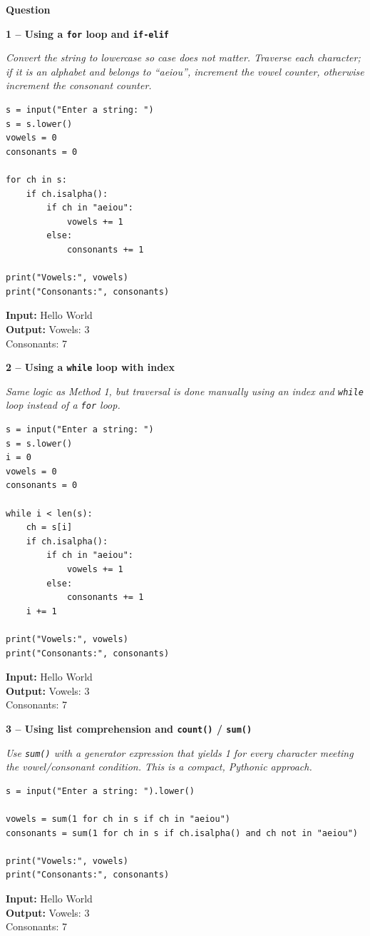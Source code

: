\documentclass[12pt]{article}
\newenvironment{qbox}[1]{\par\bigskip\noindent\textbf{#1}\par}{\par\medskip}
\newcommand{\1}{Question}
\newcommand{\method}[1]{\par\medskip\noindent\textbf{#1}\par}
\newcommand{\logicbox}[1]{\par\smallskip\noindent\textit{#1}\par}
\newcommand{\inout}[2]{\par\smallskip\noindent\textbf{Input:} #1\\\textbf{Output:} #2\par}
\begin{document}
\begin{qbox}{\1}

\method{1 -- Using a \texttt{for} loop and \texttt{if-elif}}
\logicbox{Convert the string to lowercase so case does not matter. Traverse each character; if it is an alphabet and belongs to ``aeiou'', increment the vowel counter, otherwise increment the consonant counter.}
\begin{lstlisting}
s = input("Enter a string: ")
s = s.lower()
vowels = 0
consonants = 0

for ch in s:
    if ch.isalpha():
        if ch in "aeiou":
            vowels += 1
        else:
            consonants += 1

print("Vowels:", vowels)
print("Consonants:", consonants)
\end{lstlisting}
\inout{Hello World}{Vowels: 3\\Consonants: 7}

\method{2 -- Using a \texttt{while} loop with index}
\logicbox{Same logic as Method 1, but traversal is done manually using an index and \texttt{while} loop instead of a \texttt{for} loop.}
\begin{lstlisting}
s = input("Enter a string: ")
s = s.lower()
i = 0
vowels = 0
consonants = 0

while i < len(s):
    ch = s[i]
    if ch.isalpha():
        if ch in "aeiou":
            vowels += 1
        else:
            consonants += 1
    i += 1

print("Vowels:", vowels)
print("Consonants:", consonants)
\end{lstlisting}
\inout{Hello World}{Vowels: 3\\Consonants: 7}

\method{3 -- Using list comprehension and \texttt{count()} / \texttt{sum()}}
\logicbox{Use \texttt{sum()} with a generator expression that yields 1 for every character meeting the vowel/consonant condition. This is a compact, Pythonic approach.}
\begin{lstlisting}
s = input("Enter a string: ").lower()

vowels = sum(1 for ch in s if ch in "aeiou")
consonants = sum(1 for ch in s if ch.isalpha() and ch not in "aeiou")

print("Vowels:", vowels)
print("Consonants:", consonants)
\end{lstlisting}
\inout{Hello World}{Vowels: 3\\Consonants: 7}
\end{qbox}
\end{document}
